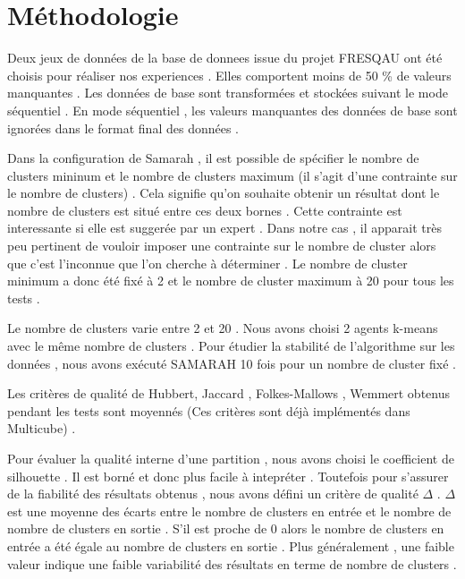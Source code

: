 \documentclass[11pt, openany]{report}
\begin{document}
\section{Méthodologie}
Deux jeux de données de la base de donnees issue du  projet FRESQAU  ont été choisis pour réaliser nos experiences . Elles comportent moins de 50 \%  de valeurs manquantes .  Les données de base sont transformées et stockées suivant le mode séquentiel  . En mode séquentiel , les valeurs manquantes des données de base sont ignorées dans le format final des données .

Dans la configuration de Samarah ,  il est possible de spécifier le nombre de clusters mininum et le nombre de clusters maximum (il s'agit d'une contrainte sur le nombre de clusters) . Cela signifie qu'on souhaite obtenir un résultat dont le nombre de clusters est situé entre ces deux bornes . Cette contrainte est interessante si elle est suggerée par un expert . Dans notre cas ,  il apparait très peu pertinent de vouloir imposer une contrainte sur le nombre de cluster alors que c'est l'inconnue que l'on cherche à déterminer . Le nombre de cluster minimum a donc été fixé à 2 et le nombre de cluster maximum à 20 pour tous les tests .

Le nombre de clusters varie entre 2 et  20 . Nous avons choisi 2 agents k-means avec le même nombre de clusters . Pour étudier la stabilité de l'algorithme sur les données , nous avons exécuté  SAMARAH  10 fois pour un nombre de cluster fixé .\par Les critères de qualité de  Hubbert,  Jaccard , Folkes-Mallows , Wemmert obtenus pendant les tests sont moyennés (Ces critères sont déjà implémentés dans Multicube) .

Pour évaluer la qualité interne d'une partition , nous avons choisi le coefficient de silhouette . Il est borné  et donc plus facile à intepréter . Toutefois pour s'assurer de la fiabilité des résultats obtenus , nous avons défini un critère de qualité  $\Delta$ . $\Delta$ est une moyenne des écarts entre le nombre  de clusters en entrée et le nombre de nombre de clusters en sortie . S'il est proche  de 0  alors le nombre de clusters en entrée a été égale au nombre de clusters en sortie . Plus généralement ,  une faible valeur indique une faible variabilité des résultats en terme de nombre de clusters .
\end{document}
